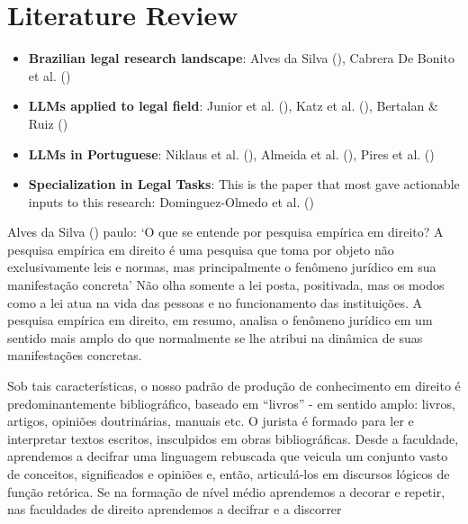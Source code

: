 \documentclass[
  12pt,
  letterpaper,
]{book}
\providecommand{\tightlist}{%
  \setlength{\itemsep}{0pt}\setlength{\parskip}{0pt}}\usepackage{longtable,booktabs,array}
\begin{document}

\chapter{Literature Review}\label{literature-review}

\begin{itemize}
\tightlist
\item
  \textbf{Brazilian legal research landscape}: Alves da Silva
  (), Cabrera De Bonito
  et al. ()
\item
  \textbf{LLMs applied to legal field}: Junior et al.
  (), Katz et al.
  (), Bertalan \& Ruiz
  ()
\item
  \textbf{LLMs in Portuguese}: Niklaus et al.
  (), Almeida et al.
  (), Pires et al.
  ()
\item
  \textbf{Specialization in Legal Tasks}: This is the paper that most
  gave actionable inputs to this research: Dominguez-Olmedo et al.
  ()
\end{itemize}

Alves da Silva ()
paulo: `O que se entende por pesquisa empírica em direito? A pesquisa
empírica em direito é uma pesquisa que toma por objeto não
exclusivamente leis e normas, mas principalmente o fenômeno jurídico em
sua manifestação concreta' Não olha somente a lei posta, positivada, mas
os modos como a lei atua na vida das pessoas e no funcionamento das
instituições. A pesquisa empírica em direito, em resumo, analisa o
fenômeno jurídico em um sentido mais amplo do que normalmente se lhe
atribui na dinâmica de suas manifestações concretas.

Sob tais características, o nosso padrão de produção de conhecimento em
direito é predominantemente bibliográfico, baseado em ``livros'' - em
sentido amplo: livros, artigos, opiniões doutrinárias, manuais etc. O
jurista é formado para ler e interpretar textos escritos, insculpidos em
obras bibliográficas. Desde a faculdade, aprendemos a decifrar uma
linguagem rebuscada que veicula um conjunto vasto de conceitos,
significados e opiniões e, então, articulá-los em discursos lógicos de
função retórica. Se na formação de nível médio aprendemos a decorar e
repetir, nas faculdades de direito aprendemos a decifrar e a discorrer
\end{document}
